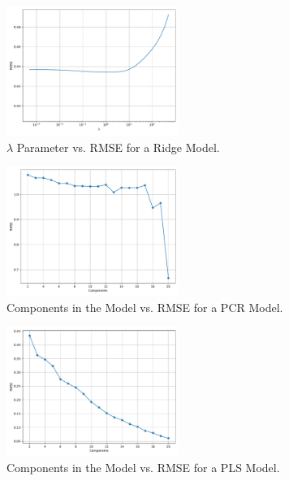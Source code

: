 \begin{figure}[htbp!]
  \centerline{\includegraphics[width=0.5\textwidth]{../../code/hw2/figures/3-lambda-ridge.pdf}}
  \caption{$\lambda$ Parameter vs. RMSE for a Ridge Model.}
  \label{fig:3-lambda-ridge}
\end{figure}



\begin{figure}[htbp!]
  \centerline{\includegraphics[width=0.5\textwidth]{../../code/hw2/figures/5-PCR-RMSE.pdf}}
  \caption{Components in the Model vs. RMSE for a PCR Model.}
  \label{fig:5-PCR-RMSE}
\end{figure}


\begin{figure}[htbp!]
  \centerline{\includegraphics[width=0.5\textwidth]{../../code/hw2/figures/5-PLS-RMSE.pdf}}
  \caption{Components in the Model vs. RMSE for a PLS Model.}
  \label{fig:5-PLS-RMSE}
\end{figure}

